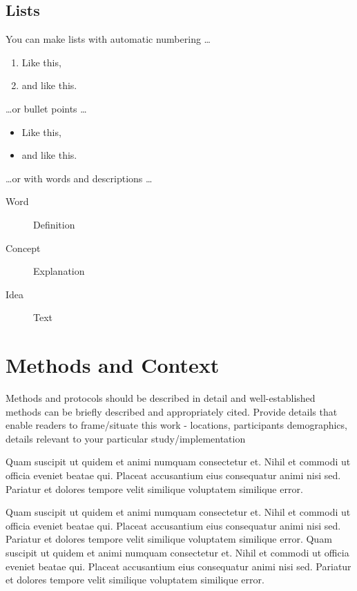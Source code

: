 \documentclass[lineno,10pt]{aseecoed}
\begin{document}
\subsection{Lists}

You can make lists with automatic numbering \dots

\begin{enumerate}[noitemsep] 
\item Like this,
\item and like this.
\end{enumerate}
\dots or bullet points \dots
\begin{itemize}[noitemsep] 
\item Like this,
\item and like this.
\end{itemize}
\dots or with words and descriptions \dots
\begin{description}
\item[Word] Definition
\item[Concept] Explanation
\item[Idea] Text
\end{description}

\section{Methods and Context}
 Methods and protocols should be described in detail and well-established methods can be briefly described and appropriately cited. Provide details that enable readers to frame/situate this work - locations, participants demographics, details relevant to your particular study/implementation

Quam suscipit ut quidem et animi numquam consectetur et. Nihil et commodi ut officia eveniet beatae qui. Placeat accusantium eius consequatur animi nisi sed. Pariatur et dolores tempore velit similique voluptatem similique error.

Quam suscipit ut quidem et animi numquam consectetur et. Nihil et commodi ut officia eveniet beatae qui. Placeat accusantium eius consequatur animi nisi sed. Pariatur et dolores tempore velit similique voluptatem similique error. Quam suscipit ut quidem et animi numquam consectetur et. Nihil et commodi ut officia eveniet beatae qui. Placeat accusantium eius consequatur animi nisi sed. Pariatur et dolores tempore velit similique voluptatem similique error.
\end{document}
